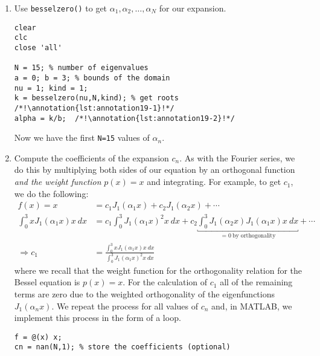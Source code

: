 \begin{enumerate}
\item Use \lstinline[style=myMatlab]{besselzero()} to get $\alpha_1,\alpha_2,\dots,\alpha_N$ for our expansion.

\begin{lstlisting}[name=lec19_ex, style=myMatlab]
clear
clc
close 'all'

N = 15; % number of eigenvalues
a = 0; b = 3; % bounds of the domain
nu = 1; kind = 1;
k = besselzero(nu,N,kind); % get roots  /*!\annotation{lst:annotation19-1}!*/
alpha = k/b;  /*!\annotation{lst:annotation19-2}!*/
\end{lstlisting}

Now we have the first \lstinline{N=15} values of $\alpha_n$.

\item Compute the coefficients of the expansion $c_n$.  As with the Fourier series, we do this by multiplying both sides of our equation by an orthogonal function \emph{and the weight function } $p(x)=x$ and integrating. For example, to get $c_1$, we do the following:
\begin{align*}
f(x) = x &= c_1 J_1\left(\alpha_1 x\right) + c_2 J_1 \left(\alpha_2 x\right) + \cdots \\
\int_0^3 x J_1\left(\alpha_1 x\right) x \ dx &= c_1 \int_0^3 J_1\left(\alpha_1 x\right)^2 x \ dx + c_2 \underbracket{\int_0^3 J_1\left(\alpha_2 x \right) J_1 \left( \alpha_1 x \right) x \ dx}_{=0 \ \text{by orthogonality}} + \cdots \\
\Rightarrow c_1 &= \frac{\int_0^3 x J_1\left(\alpha_1 x\right) x \ dx}{\int_0^3 J_1\left(\alpha_1 x\right)^2 x \ dx}
\end{align*}
where we recall that the weight function for the orthogonality relation for the Bessel equation is $p(x)=x$.  For the calculation of $c_1$ all of the remaining terms are zero due to the weighted orthogonality of the eigenfunctions $J_1\left(\alpha_n x \right)$.  We repeat the process for all values of $c_n$ and, in MATLAB, we implement this process in the form of a loop.
\begin{lstlisting}[name=lec19_ex,style=myMatlab]
f = @(x) x; 
cn = nan(N,1); % store the coefficients (optional)


\end{lstlisting}
\end{enumerate}
